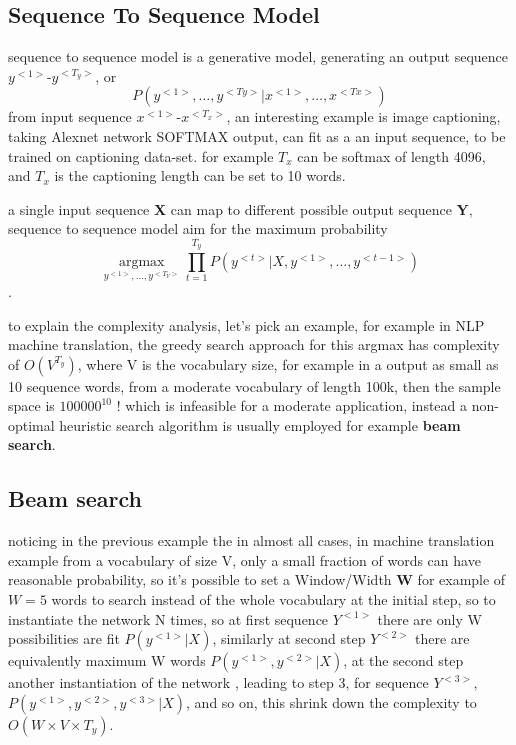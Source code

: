 \documentclass[4apaper,12pt]{book}
\begin{document}
\begin{description}
    \section{Sequence To Sequence Model}
    \begin{description}
    \item sequence to sequence model is a generative model, generating an output sequence $y^{<1>}\text{-}y^{<T_y>}$, or $$P(y^{<1>},\dots,y^{<Ty>}|x^{<1>},\dots,x^{<Tx>})$$ from input sequence $x^{<1>}\text{-}x^{<T_x>}$, an interesting example is image captioning, taking Alexnet network SOFTMAX output, can fit as a an input sequence, to be trained on captioning data-set. for example $T_x$ can be softmax of length 4096, and $T_x$ is the captioning length can be set to 10 words.
    \item a single input sequence \textbf{X} can map to different possible output sequence \textbf{Y}, sequence to sequence model aim for the maximum probability $$\underset{y^{<1>},\dots,y^{<T_Y>}}{\operatorname{argmax}}\prod_{t=1}^{T_y}P(y^{<t>}|X,y^{<1>},\dots,y^{<t-1>})$$.
    \item to explain the complexity analysis, let's pick an example, for example in NLP machine translation, the greedy search approach for this argmax has complexity of $O(V^{T_y})$, where V is the vocabulary size, for example in a output as small as 10 sequence words, from a moderate vocabulary of length 100k, then the sample space is $100000^{10}$ ! which is infeasible for a moderate application, instead a non-optimal heuristic search algorithm is usually employed for example  \textbf{beam search}.
      \subsection{Beam search}
      \begin{description}
      \item noticing in the previous example the in almost all cases, in machine translation example from a vocabulary of size V, only a small fraction of words can have reasonable probability, so it's possible to set a Window/Width \textbf{W} for example of $W=5$ words to search instead of the whole vocabulary at the initial step, so to instantiate the network N times, so at first sequence $Y^{<1>}$ there are only W possibilities are fit  $P(y^{<1>}|X)$, similarly at second step $Y^{<2>}$ there are equivalently maximum W words $P(y^{<1>},y^{<2>}|X)$, at the second step another instantiation of the network , leading to step 3, for sequence  $Y^{<3>}$, $P(y^{<1>},y^{<2>},y^{<3>}|X)$, and so on, this shrink down the complexity to $O(W\times{V}\times{T_y})$.

\end{description}
\end{description}
\end{description}
\end{document}
